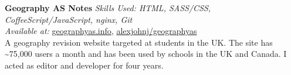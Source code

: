 \textbf{Geography AS Notes}  \newline
\textit{Skills Used: HTML, SASS/CSS, CoffeeScript/JavaScript, nginx, Git}\\
\textit{Available at:} \href{https://geographyas.info}{geographyas.info}, \href{https://github.com/\myweb/geographyas}{alexjohnj/geographyas} \\
A geography revision website targeted at students in the UK. The site has
\textasciitilde{}75,000 users a month and has been used by schools in the UK and
Canada. I acted as editor and developer for four years.

